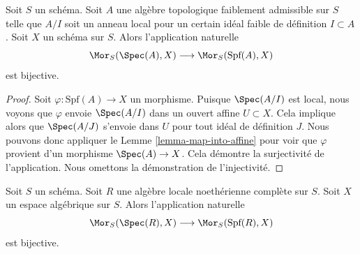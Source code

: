 \begin{lemma}
\label{lemma-map-into-scheme}
Soit $S$ un schéma. Soit $A$ une algèbre topologique faiblement admissible
sur $S$ telle que $A/I$ soit un anneau local pour un certain idéal faible
de définition $I \subset A$. Soit $X$ un schéma sur $S$. Alors
l'application naturelle
$$
\Mor_S(\Spec(A), X)
\longrightarrow
\Mor_S(\text{Spf}(A), X)
$$
est bijective.
\end{lemma}

\begin{proof}
Soit $\varphi : \text{Spf}(A) \to X$ un morphisme. Puisque $\Spec(A/I)$
est local, nous voyons que $\varphi$ envoie $\Spec(A/I)$ dans un
ouvert affine $U \subset X$. Cela implique alors que $\Spec(A/J)$
s'envoie dans $U$ pour tout idéal de définition $J$. Nous pouvons donc
appliquer le Lemme \ref{lemma-map-into-affine} pour voir que $\varphi$ provient
d'un morphisme $\Spec(A) \to X$. Cela démontre la surjectivité de l'application.
Nous omettons la démonstration de l'injectivité.
\end{proof}

\begin{lemma}
\label{lemma-map-into-algebraic-space}
Soit $S$ un schéma. Soit $R$ une algèbre locale noethérienne complète sur $S$.
Soit $X$ un espace algébrique sur $S$. Alors l'application naturelle
$$
\Mor_S(\Spec(R), X)
\longrightarrow
\Mor_S(\text{Spf}(R), X)
$$
est bijective.
\end{lemma}

